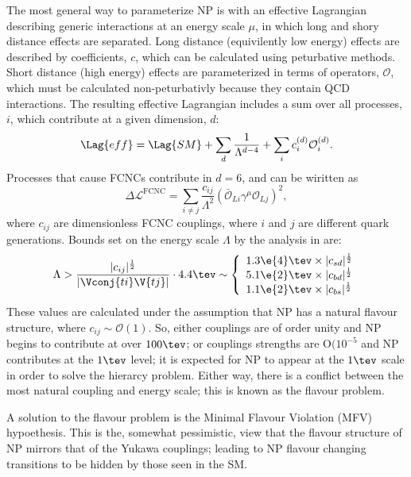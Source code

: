 The most general way to parameterize NP is with an effective Lagrangian describing generic
interactions at an energy scale $\mu$, in which long and shory distance effects are separated.
Long distance (equivilently low energy) effects are described by coefficients, $c$, which can be
calculated using peturbative methods.
Short distance (high energy) effects are parameterized in terms of operators, $\mathcal{O}$,
which must be calculated non-peturbativly because they contain QCD interactions.
The resulting effective Lagrangian includes a sum over all processes, $i$, which contribute at a
given dimension, $d$:
\begin{equation}
  \Lag{eff}
  =
  \Lag{SM} + \sum_d\frac1{\Lambda^{d-4}}
  + \sum_ic_i^{(d)}\mathcal{O}_i^{(d)}.
\end{equation}
Processes that cause FCNCs contribute in $d=6$, and can be wiritten as
\begin{equation}
  \Delta\mathcal{L}^\mathrm{FCNC}
  =
  \sum_{i\neq j}\frac{c_{ij}}{\Lambda^2}
  \left(\bar{\mathcal{O}}_{Li}\gamma^\mu\mathcal{O}_{Lj}\right)^2,
\end{equation}
where $c_{ij}$ are dimensionless FCNC couplings, where $i$ and $j$ are different quark generations.
Bounds set on the energy scale $\Lambda$ by the analysis in  are:
\begin{equation}
  \Lambda > \frac{|c_{ij}|^\frac12}{|\Vconj{ti}\V{tj}|}\cdot4.4\tev
  \sim
  \left\{
    \begin{array}{l}
      1.3\e{4}\tev\times |c_{sd}|^\frac12 \\
      5.1\e{2}\tev\times |c_{bd}|^\frac12 \\
      1.1\e{2}\tev\times |c_{bs}|^\frac12 \\
    \end{array}\right.
\end{equation}
These values are calculated under the assumption that NP has a natural flavour structure, where
$c_{ij}\sim\mathcal{O}(1)$.
So, either couplings are of order unity and NP begins to contribute at over $100\tev$; or couplings
strengths are $\mathrm{O}(10^{-5}$ and NP contributes at the $1\tev$ level;
it is expected for NP to appear at the $1\tev$ scale in order to solve the hierarcy problem.
Either way, there is a conflict between the most natural coupling and energy scale; this is known
as the flavour problem.

A solution to the flavour problem is the Minimal Flavour Violation (MFV) hypoethesis.
This is the, somewhat pessimistic, view that the flavour structure of NP mirrors that of the Yukawa
couplings; leading to NP flavour changing transitions to be hidden by those seen in the SM.



